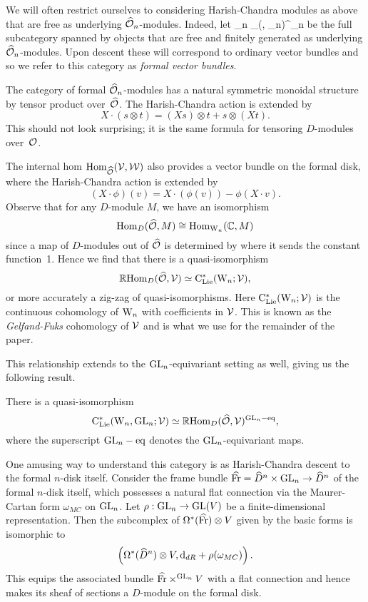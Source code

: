 We will often restrict ourselves to considering Harish-Chandra modules as above that are free as underlying $\widehat{\mathcal O}_n$-modules. 
Indeed, let
\ben
\VB_n \subset \Mod_{(\Vect, \GL_n)}^{\cO_n}
\een
be the full subcategory spanned by objects that are free and finitely generated as underlying $\widehat{\mathcal O}_n$-modules. 
Upon descent these will correspond to ordinary vector bundles and so
we refer to this category as {\em formal vector bundles}. 

The category of formal $\widehat{\mathcal O}_n$-modules has a natural symmetric monoidal structure by tensor product over~$\widehat{\mathcal O}$. The Harish-Chandra action is extended by
\[
X \cdot (s \otimes t) = (X s) \otimes t + s \otimes (Xt). 
\]
This should not look surprising; it is the same formula for tensoring
$D$-modules over~$\mathcal O$. 

The internal hom ${\rm Hom}_{\widehat{\mathcal O}}(\mathcal{V},\mathcal{W})$ also provides a vector bundle on the formal disk, 
where the Harish-Chandra action is extended by
\[
(X \cdot \phi)(v) = X \cdot (\phi(v)) - \phi(X\cdot v). 
\]
Observe that for any $D$-module $M$, we have an isomorphism
\[
{\rm Hom}_{D}(\widehat{\mathcal O}, M) \cong {\rm Hom}_{{{\rm W}_n}}(\mathbb C, M)
\]
since a map of $D$-modules out of $\widehat{\mathcal O}$ is determined by where it sends the constant function~1. 
Hence we find that there is a quasi-isomorphism 
\[
\mathbb R{\rm Hom}_{D}(\widehat{\mathcal O}, \mathcal{V}) \simeq {\rm C}_{{\rm Lie}}^*({{\rm W}_n} ; \mathcal{V}),
\]
or more accurately a zig-zag of quasi-isomorphisms. Here
${\rm C}_{{\rm Lie}}^*({{\rm W}_n} ; \mathcal{V})$ is the continuous cohomology of ${{\rm W}_n}$ with
coefficients in $\mathcal{V}$. This is known as the {\em Gelfand-Fuks}
cohomology of $\mathcal{V}$ and is what we use for the remainder of the
paper. 

This relationship extends to the ${\rm GL}_n$-equivariant setting as well, giving us the following result.

\begin{lemma}
There is a quasi-isomorphism
\[
{\rm C}_{{\rm Lie}}^*({{\rm W}_n},{\rm GL}_n; \mathcal{V}) \simeq \mathbb R {\rm Hom}_D(\widehat{\mathcal O},\mathcal{V})^{{\rm GL}_n-{\rm eq}},
\]
where the superscript ${\rm GL}_n-{\rm eq}$ denotes the ${\rm GL}_n$-equivariant maps.
\end{lemma}

\begin{rmk}
One amusing way to understand this category is as Harish-Chandra descent to the formal $n$-disk itself. 
Consider the frame bundle $\widehat{{\rm Fr}} = \widehat{D}^n \times {\rm GL}_n \to \widehat{D}^n$ of the formal $n$-disk itself, 
which possesses a natural flat connection via the Maurer-Cartan form $\omega_{MC}$ on ${\rm GL}_n$. 
Let $\rho: {\rm GL}_n \to {\rm GL}(V)$ be a finite-dimensional representation. 
Then the subcomplex of $\Omega^*(\widehat{{\rm Fr}})\otimes V$ given by the basic forms is isomorphic to
\[
\left(\Omega^*(\widehat{D}^n) \otimes V, {\rm d}_{dR} + \rho(\omega_{MC}) \right).
\]
This equips the associated bundle $\widehat{{\rm Fr}}\times^{{\rm GL}_n} V$ with a flat connection and 
hence makes its sheaf of sections a $D$-module on the formal disk.
\end{rmk}

